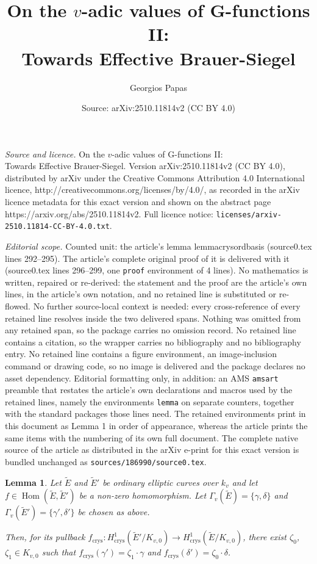 \documentclass[10pt,a4paper]{amsart}
\title{On the $v$-adic values of G-functions II:\\ \Large Towards Effective Brauer-Siegel}
\author{Georgios Papas}
\date{Source: arXiv:2510.11814v2 (CC BY 4.0)}
\newtheorem{lemma}{Lemma}
\DeclareMathOperator{\crys}{crys}
\DeclareMathOperator{\homm}{Hom}
\begin{document}
\maketitle

\noindent\emph{Source and licence.} On the $v$-adic values of G-functions II:\\ \Large Towards Effective Brauer-Siegel. Version arXiv:2510.11814v2 (CC BY 4.0), distributed by arXiv under the Creative Commons Attribution 4.0 International licence, http://creativecommons.org/licenses/by/4.0/, as recorded in the arXiv licence metadata for this exact version and shown on the abstract page https://arxiv.org/abs/2510.11814v2. Full licence notice: \texttt{licenses/arxiv-2510.11814-CC-BY-4.0.txt}.\par\smallskip

\noindent\textit{Editorial scope.} Counted unit: the article's lemma lemmacrysordbasis (source0.tex lines 292--295). The article's complete original proof of it is delivered with it (source0.tex lines 296--299, one \texttt{proof} environment of 4 lines). No mathematics is written, repaired or re-derived: the statement and the proof are the article's own lines, in the article's own notation, and no retained line is substituted or re-flowed.  No further source-local context is needed: every cross-reference of every retained line resolves inside the two delivered spans.  Nothing was omitted from any retained span, so the package carries no omission record.  No retained line contains a citation, so the wrapper carries no bibliography and no bibliography entry.  No retained line contains a figure environment, an image-inclusion command or drawing code, so no image is delivered and the package declares no asset dependency.  Editorial formatting only, in addition: an AMS \texttt{amsart} preamble that restates the article's own declarations and macros used by the retained lines, namely the environments \texttt{lemma} on separate counters, together with the standard packages those lines need.  The retained environments print in this document as Lemma 1 in order of appearance, whereas the article prints the same items with the numbering of its own full document.  The complete native source of the article as distributed in the arXiv e-print for this exact version is bundled unchanged as \texttt{sources/186990/source0.tex}.
\begin{lemma}\label{lemmacrysordbasis}Let $\tilde{E}$ and $\tilde{E}'$ be ordinary elliptic curves over $k_v$ and let $f\in \homm(\tilde{E},\tilde{E}')$ be a non-zero homomorphism. Let $\Gamma_v(\tilde{E})=\{\gamma,\delta\}$ and $\Gamma_v(\tilde{E}')=\{\gamma',\delta'\}$ be chosen as above. 
	
	Then, for its pullback $f_{\crys}:H^1_{\crys}(\tilde{E}'/K_{v,0})\rightarrow H^1_{\crys}(\tilde{E}/K_{v,0})$, there exist $\zeta_0$, $\zeta_1\in K_{v,0}$ such that $f_{\crys}(\gamma')=\zeta_1\cdot \gamma$ and $f_{\crys}(\delta')=\zeta_0\cdot \delta$.
\end{lemma}
\end{document}
